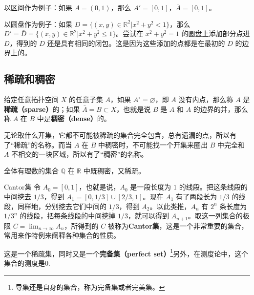 以区间作为例子：如果 $A=(0,1)$，那么 $A'=[0,1]$，$\bar{A}=[0,1]$。

以圆盘作为例子：如果 $D=\{(x,y)\in\mathbb{R}^2|x^2+y^2<1\}$，那么 $D'=\bar{D}=\{(x,y)\in\mathbb{R}^2|x^2+y^2\leq1\}$。尝试在 $x^2+y^2=1$ 的圆盘上添加部分点进 $D$，得到的 $D$ 还是具有相同的闭包。这是因为这些添加的点都是在最初的 $D$ 的边界上的。

\subsection{稀疏和稠密}
给定任意拓扑空间 $X$ 的任意子集 $A$，如果 $A^\circ=\varnothing$，即 $A$ 没有内点，那么称 $A$ 是\textbf{稀疏（sparse）}的；如果 $\bar{A}=B\subset X$，也就是说 $B$ 是 $A$ 和 $A$ 的边界的并，那么称 $A$ 在 $B$ 中是\textbf{稠密（dense）}的。

无论取什么开集，它都不可能被稀疏的集合完全包含，总有遗漏的点，所以有了“稀疏”的名称。而当 $A$ 在 $B$ 中稠密时，不可能找一个开集来圈出 $B$ 中完全和 $A$ 不相交的一块区域，所以有了“稠密”的名称。

全体有理数的集合 $\mathbb{Q}$ 在 $\mathbb{R}$ 中既稠密，又稀疏。

\begin{example}{Cantor集}\label{ex_Topo0_2}
令 $A_0=[0,1]$，也就是说，$A_0$ 是一段长度为 $1$ 的线段。把这条线段的中间挖去 $1/3$，得到 $A_1=[0,1/3]\cup[2/3,1]$。现在 $A_1$ 有了两段长为 $1/3$ 的线段，同样地，分别挖去它们中间的 $1/3$，得到 $A_2$。以此类推，$A_n$ 有 $2^n$ 条长度为 $1/3^n$ 的线段，把每条线段的中间挖掉 $1/3$，就可以得到 $A_{n+1}$。取这一列集合的极限 $C=\lim_{n\rightarrow\infty}A_n$，所得到的 $C$ 被称为\textbf{Cantor集}，这是一个非常重要的集合，常用来作特例来阐释各种集合的性质。

这是一个稀疏集，同时又是一个\textbf{完备集（perfect set）}\footnote{导集还是自身的集合，称为完备集或者完美集。}另外，在测度论中，这个集合的测度是0. 
\end{example}
